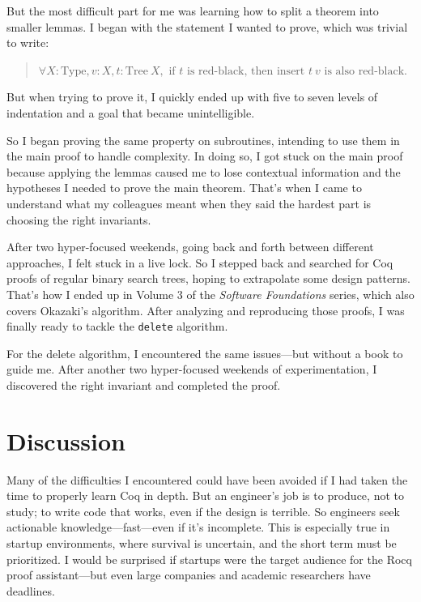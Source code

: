 \documentclass[11pt]{article}
\begin{document}
But the most difficult part for me was learning how to split a theorem into smaller lemmas. I began with the statement I wanted to prove, which was trivial to write:
\begin{quote}
   $\forall X : \text{Type}, v : X, t : \text{Tree}\ X, \text{ if } t \text{ is red-black, then } \text{insert } t\ v \text{ is also red-black.}$
\end{quote}

But when trying to prove it, I quickly ended up with five to seven levels of indentation and a goal that became unintelligible.

So I began proving the same property on subroutines, intending to use them in the main proof to handle complexity. In doing so, I got stuck on the main proof because applying the lemmas caused me to lose contextual information and the hypotheses I needed to prove the main theorem. That's when I came to understand what my colleagues meant when they said the hardest part is choosing the right invariants.

After two hyper-focused weekends, going back and forth between different approaches, I felt stuck in a live lock. So I stepped back and searched for Coq proofs of regular binary search trees, hoping to extrapolate some design patterns. That's how I ended up in Volume 3 of the \textit{Software Foundations} series, which also covers Okazaki's algorithm. After analyzing and reproducing those proofs, I was finally ready to tackle the \texttt{delete} algorithm.

For the delete algorithm, I encountered the same issues---but without a book to guide me. After another two hyper-focused weekends of experimentation, I discovered the right invariant and completed the proof.

\section{Discussion}
Many of the difficulties I encountered could have been avoided if I had taken the time to properly learn Coq in depth. But an engineer's job is to produce, not to study; to write code that works, even if the design is terrible. So engineers seek actionable knowledge---fast---even if it's incomplete. This is especially true in startup environments, where survival is uncertain, and the short term must be prioritized. I would be surprised if startups were the target audience for the Rocq proof assistant---but even large companies and academic researchers have deadlines.
\end{document}
